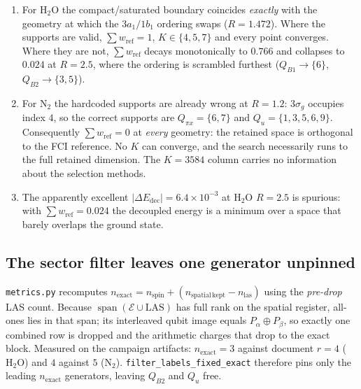 \begin{enumerate}[leftmargin=1.4em]
  \item For $\mathrm{H_2O}$ the compact/saturated boundary coincides
        \emph{exactly} with the geometry at which the $3a_1/1b_1$ ordering
        swaps ($R=1.472$). Where the supports are valid, $\sum w_{\mathrm{ref}}
        = 1$, $K \in \{4,5,7\}$ and every point converges. Where they are not,
        $\sum w_{\mathrm{ref}}$ decays monotonically to $0.766$ and collapses
        to $0.024$ at $R = 2.5$, where the ordering is scrambled furthest
        ($Q_{B1}\!\to\!\{6\}$, $Q_{B2}\!\to\!\{3,5\}$).
  \item For $\mathrm{N_2}$ the hardcoded supports are already wrong at
        $R=1.2$: $3\sigma_g$ occupies index $4$, so the correct supports are
        $Q_{\pi x}=\{6,7\}$ and $Q_u=\{1,3,5,6,9\}$. Consequently
        $\sum w_{\mathrm{ref}} = 0$ at \emph{every} geometry: the retained
        space is orthogonal to the FCI reference. No $K$ can converge, and the
        search necessarily runs to the full retained dimension. The $K=3584$
        column carries no information about the selection methods.
  \item The apparently excellent $|\Delta E_{\mathrm{dec}}| = 6.4\times10^{-3}$
        at $\mathrm{H_2O}$ $R=2.5$ is spurious: with
        $\sum w_{\mathrm{ref}} = 0.024$ the decoupled energy is a minimum over
        a space that barely overlaps the ground state.
\end{enumerate}

\subsection{The sector filter leaves one generator unpinned}

\texttt{metrics.py} recomputes
$n_{\mathrm{exact}} = n_{\mathrm{spin}} +
(n_{\mathrm{spatial\,kept}} - n_{\mathrm{las}})$
using the \emph{pre-drop} LAS count. Because
$\operatorname{span}(\mathcal E\cup\mathrm{LAS})$ has full rank on the spatial
register, all-ones lies in that span; its interleaved qubit image equals
$P_\alpha \oplus P_\beta$, so exactly one combined row is dropped and the
arithmetic charges that drop to the exact block. Measured on the campaign
artifacts: $n_{\mathrm{exact}} = 3$ against document $r = 4$ ($\mathrm{H_2O}$)
and $4$ against $5$ ($\mathrm{N_2}$).
\texttt{filter\_labels\_fixed\_exact} therefore pins only the leading
$n_{\mathrm{exact}}$ generators, leaving $Q_{B2}$ and $Q_u$ free.

